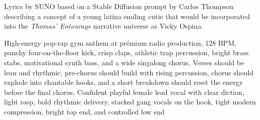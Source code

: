 
\begin{notes}
Lyrics by SUNO based on a Stable Diffusion prompt by Carlos Thompson describing a concept of a young latina smiling cutie %
that would be incorporated into the \emph{Thomas’ Entourage} narrative universe as Vicky Ospina.
\end{notes}
\begin{style}
High-energy pop-rap gym anthem at  prémium radio production, 128 BPM, punchy four-on-the-floor kick, crisp claps, athletic trap percussion, bright brass stabs, motivational synth bass, and a wide singalong chorus, Verses should be lean and rhythmic, pre-chorus should build with rising percussion, chorus should explode into chantable hooks, and a short breakdown should reset the energy before the final chorus, Confident playful female lead vocal with clear diction, light rasp, bold rhythmic delivery, stacked gang vocals on the hook, tight modern compression, bright top end, and controlled low end
\end{style}
